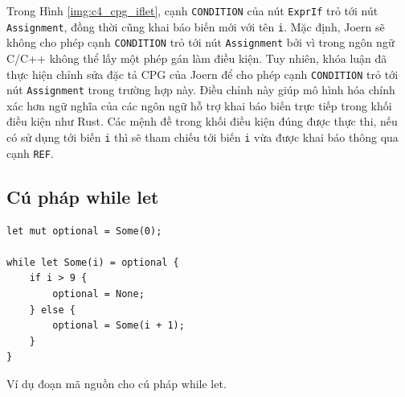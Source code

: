 
Trong Hình \ref{img:c4_cpg_iflet}, cạnh \texttt{CONDITION} của nút \texttt{ExprIf} trỏ tới nút \texttt{Assignment}, đồng thời cũng khai báo biến mới với tên \texttt{i}.
Mặc định, Joern sẽ không cho phép cạnh \texttt{CONDITION} trỏ tới nút \texttt{Assignment} bởi vì trong ngôn ngữ C/C++ không thể lấy một phép gán làm điều kiện.
Tuy nhiên, khóa luận đã thực hiện chỉnh sửa đặc tả CPG của Joern để cho phép cạnh \texttt{CONDITION} trỏ tới nút \texttt{Assignment} trong trường hợp này.
Điều chỉnh này giúp mô hình hóa chính xác hơn ngữ nghĩa của các ngôn ngữ hỗ trợ khai báo biến trực tiếp trong khối điều kiện như Rust.
Các mệnh đề trong khối điều kiện đúng được thực thi, nếu có sử dụng tới biến \texttt{i} thì sẽ tham chiếu tới biến \texttt{i} vừa được khai báo thông qua cạnh \texttt{REF}.

\subsection{Cú pháp while let}




\begin{listing}[H]
\begin{verbatim}
let mut optional = Some(0);

while let Some(i) = optional {
    if i > 9 {
        optional = None;
    } else {
        optional = Some(i + 1);
    }
}
\end{verbatim}
\caption{Ví dụ đoạn mã nguồn cho cú pháp while let.}
\label{code:c4_whilelet}
\end{listing}

